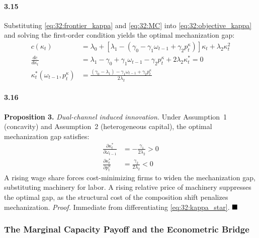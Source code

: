 \paragraph{3.15}
Substituting \eqref{eq:32:frontier_kappa} and
\eqref{eq:32:MC} into \eqref{eq:32:objective_kappa} and
solving the first-order condition yields the optimal
mechanization gap:
\begin{align}
	c(\kappa_t) &= \lambda_0
	+ \left[\lambda_1 - (\gamma_0 - \gamma_1 \omega_{t-1}
	+ \gamma_2 p^\kappa_t)\right] \kappa_t
	+ \lambda_2 \kappa_t^2
	\label{eq:32:unconstrained_kappa} \\
	\frac{dc}{d\kappa_t} &= \lambda_1 - \gamma_0
	+ \gamma_1 \omega_{t-1} - \gamma_2 p^\kappa_t
	+ 2\lambda_2 \kappa_t^* = 0
	\label{eq:32:foc_kappa} \\
	\kappa_t^*(\omega_{t-1}, p^\kappa_t)
	&= \frac{(\gamma_0 - \lambda_1) - \gamma_1 \omega_{t-1}
		+ \gamma_2 p^\kappa_t}{2\lambda_2}
	\label{eq:32:kappa_star}
\end{align}

\paragraph{3.16}
\textbf{Proposition 3.} \textit{Dual-channel induced
	innovation.} Under Assumption~1 (concavity) and
Assumption~2 (heterogeneous capital), the optimal
mechanization gap satisfies:
\begin{align}
	\frac{\partial \kappa_t^*}{\partial \omega_{t-1}}
	&= -\frac{\gamma_1}{2\lambda_2} > 0
	\label{eq:32:cs_omega} \\
	\frac{\partial \kappa_t^*}{\partial p^\kappa_t}
	&= \frac{\gamma_2}{2\lambda_2} < 0
	\label{eq:32:cs_price}
\end{align}
A rising wage share forces cost-minimizing firms to widen
the mechanization gap, substituting machinery for labor.
A rising relative price of machinery suppresses the optimal
gap, as the structural cost of the composition shift
penalizes mechanization. \textit{Proof.} Immediate from
differentiating \eqref{eq:32:kappa_star}. $\hfill\blacksquare$

\subsubsection{The Marginal Capacity Payoff and the
	Econometric Bridge}

